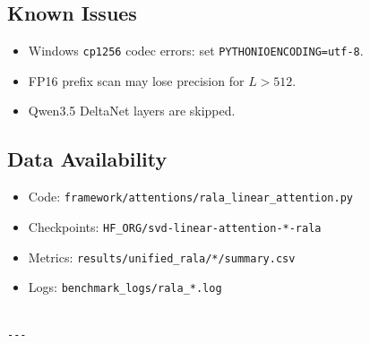 \subsection{Known Issues}

\begin{itemize}
\item Windows \texttt{cp1256} codec errors: set \texttt{PYTHONIOENCODING=utf-8}.
\item FP16 prefix scan may lose precision for $L > 512$.
\item Qwen3.5 DeltaNet layers are skipped.

\end{itemize}
\subsection{Data Availability}

\begin{itemize}
\item Code: \texttt{framework/attentions/rala\_linear\_attention.py}
\item Checkpoints: \texttt{{{HF\_ORG}}/svd-linear-attention-*-rala}
\item Metrics: \texttt{results/unified\_rala/*/summary.csv}
\item Logs: \texttt{benchmark\_logs/rala\_*.log}
\end{itemize}
\begin{lstlisting}

---
\end{lstlisting}